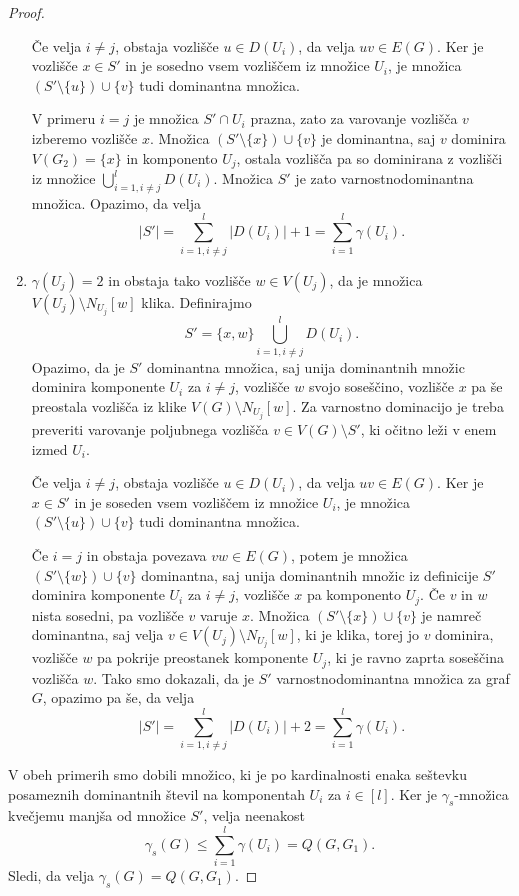 \documentclass[12pt,a4paper,twoside]{article}
\theoremstyle{definition} %
\theoremstyle{plain} %
\numberwithin{equation}{section}  %
\begin{document}
\begin{proof}
\begin{enumerate}[label=($\roman*$)]
Če velja $i\neq j$, obstaja vozlišče $u \in D(U_i)$, da velja $uv \in E(G)$. Ker je vozlišče $x \in S'$ in je sosedno vsem vozliščem iz množice $U_i$, je množica $(S' \setminus \{u\}) \cup\{v\}$ tudi dominantna množica.

V primeru $i=j$ je množica $S' \cap U_i$ prazna, zato za varovanje vozlišča $v$ izberemo vozlišče $x$. Množica $(S' \setminus \{x\}) \cup \{v\}$ je dominantna, saj $v$ dominira $V(G_2) = \{x\}$ in komponento $U_j$, ostala vozlišča pa so dominirana z vozlišči iz množice $\bigcup_{i = 1, i \neq j}^l D(U_i)$. Množica $S'$ je zato varnostnodominantna množica. Opazimo, da velja $$|S'| = \sum_{i=1, i\neq j}^l|D(U_i)|+ 1= \sum_{i=1}^l\gamma(U_i).$$

\item $\gamma(U_j) = 2$ in obstaja tako vozlišče $w \in V(U_j)$, da je množica $V(U_j) \setminus N_{U_j}[w]$ klika. Definirajmo $$S' = \{x, w\} \bigcup\limits_{i = 1, i \neq j}^l D(U_i).$$Opazimo, da je $S'$ dominantna množica, saj unija dominantnih množic dominira komponente $U_i$ za $i \neq j$, vozlišče $w$ svojo soseščino, vozlišče $x$ pa še preostala vozlišča iz klike $V(G) \setminus N_{U_j}[w]$. Za varnostno dominacijo je treba preveriti varovanje poljubnega vozlišča $v \in V(G) \setminus S'$, ki očitno leži v enem izmed $U_i$.

Če velja $i\neq j$, obstaja vozlišče $u \in D(U_i)$, da velja $uv \in E(G)$. Ker je $x \in S'$ in je soseden vsem vozliščem iz množice $U_i$, je množica $(S' \setminus \{u\}) \cup\{v\}$ tudi dominantna množica.

Če $i=j$ in obstaja povezava $vw \in E(G)$, potem je množica $(S' \setminus \{w\}) \cup \{v\}$ dominantna, saj unija dominantnih množic iz definicije $S'$ dominira komponente $U_i$ za $i\neq j$, vozlišče $x$ pa komponento $U_j$. Če $v$ in $w$ nista sosedni, pa vozlišče $v$ varuje $x$. Množica $(S' \setminus \{x\}) \cup \{v\}$ je namreč dominantna, saj velja $v \in V(U_j) \setminus N_{U_j}[w]$, ki je klika, torej jo $v$ dominira, vozlišče $w$ pa pokrije preostanek komponente $U_j$, ki je ravno zaprta soseščina vozlišča $w$. Tako smo dokazali, da je $S'$ varnostnodominantna množica za graf $G$, opazimo pa še, da velja$$|S'| = \sum_{i=1, i\neq j}^l|D(U_i)|+ 2= \sum_{i=1}^l\gamma(U_i).$$
\end{enumerate}
V obeh primerih smo dobili množico, ki je po kardinalnosti enaka seštevku posameznih dominantnih števil na komponentah $U_i$ za $i \in [l]$. Ker je $\gamma_s$-množica kvečjemu manjša od množice $S'$, velja neenakost $$\gamma_s(G) \leq \sum\limits_{i = 1}^l\gamma(U_i)  = Q(G, G_1).$$
Sledi, da velja $\gamma_s(G)  = Q(G, G_1)$.
\end{proof}
\end{document}
